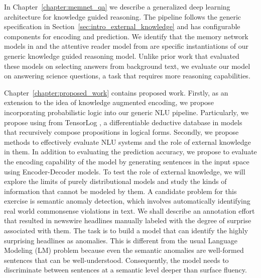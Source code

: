 In Chapter~\ref{chapter:memnet_qa} we describe a generalized deep learning architecture for knowledge guided reasoning.
The pipeline follows the generic specification in Section~\ref{sec:intro_external_knowledge} and has configurable components
for encoding and prediction. We identify that the memory network models in \cite{weston2014memory,Sukhbaatar2015EndToEndMN,Xiong2016DynamicMN}
and the attentive reader model from \cite{hermann2015teaching} are specific instantiations of our generic knowledge guided reasoning model.
Unlike prior work that evaluated these models on selecting answers from background text, we evaluate our model on answering science questions, 
a task that requires more reasoning capabilities.

Chapter~\ref{chapter:proposed_work} contains proposed work. Firstly, as an extension to the idea of knowledge augmented encoding, 
we propose incorporating probabilistic logic into our generic NLU pipeline. Particularly, we propose using from TensorLog \cite{cohen2016tensorlog},
a differentiable deductive database in models that recursively compose propositions in logical forms. Secondly, we propose methods to effectively evaluate NLU systems
and the role of external knowledge in them. In addition to evaluating the prediction accuracy, we propose to evaluate the encoding capability of the model by 
generating sentences in the input space using Encoder-Decoder models. To test the role of external knowledge, we will explore the limits of purely distributional models
and study the kinds of information that cannot be modeled by them. A candidate problem for this
exercise is semantic anomaly detection, which involves automatically 
identifying real world commonsense violations in text. We shall describe an annotation
effort that resulted in newswire headlines manually labeled with the degree
of surprise associated with them. The task is to build a model that can identify the highly
surprising headlines as anomalies. This is different from the usual Language Modeling (LM) problem
because even the semantic anomalies are well-formed sentences that can be well-understood. Consequently,
the model needs to discriminate between sentences at a semantic level deeper than surface fluency.